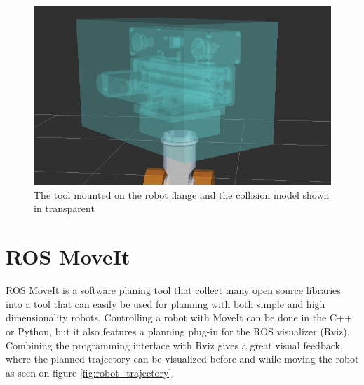 \begin{figure}[htb]
	\begin{center}
		\includegraphics[scale=0.5,trim=0 0 0 0]{graphics/05_robotics/tool_collision_model.png}%
		\caption{The tool mounted on the robot flange and the collision model shown in transparent}
		\label{fig:tool_collision_model}
	\end{center}
\end{figure}

\section{ROS MoveIt}
\label{sec:moveit}
ROS MoveIt is a software planing tool that collect many open source libraries into a tool that can easily be used for planning with both simple and high dimensionality robots.  Controlling a robot with MoveIt can be done in the C++ or Python, but it also features a planning plug-in for the ROS visualizer (Rviz). Combining the programming interface with Rviz gives a great visual feedback, where the planned trajectory can be visualized before and while moving the robot as seen on figure \ref{fig:robot_trajectory}.


